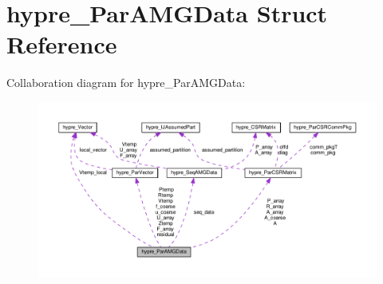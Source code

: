\hypertarget{structhypre__ParAMGData}{}\section{hypre\+\_\+\+Par\+A\+M\+G\+Data Struct Reference}
\label{structhypre__ParAMGData}


Collaboration diagram for hypre\+\_\+\+Par\+A\+M\+G\+Data\+:
\nopagebreak
\begin{figure}[H]
\begin{center}
\leavevmode
\includegraphics[width=350pt]{structhypre__ParAMGData__coll__graph}
\end{center}
\end{figure}
